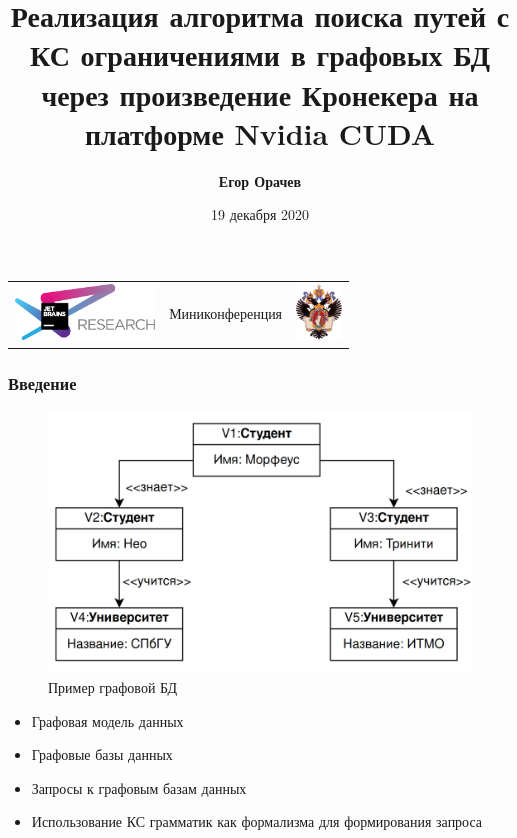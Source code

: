 \documentclass[xcolor=table,english]{beamer}
\title[Kronecker CFPQ GPGPU]{Реализация алгоритма поиска путей с КС ограничениями в графовых БД через произведение Кронекера на платформе Nvidia CUDA}
\institute[СПбГУ]{
JetBrains Research, Лаборатория языковых инструментов  \\
Санкт-Петербургский Государственный университет
}
\author[Егор Орачев]{\textbf{Егор Орачев}}
\date{19 декабря 2020}
\begin{document}
{
\begin{frame}[fragile]
  \begin{table}
  \centering
  \begin{tabularx}{\linewidth}{YcX}
    \includegraphics[height=1.5cm]{pictures/jetbrainsResearch.pdf} \hfill
    & \begin{minipage}[t]{0.3\textwidth}\center \vspace{-1cm} Миниконференция
      \end{minipage}
    & \hfill \includegraphics[height=1.5cm]{pictures/SPbGU_Logo.png}
  \end{tabularx}
  \end{table}
  \titlepage
\end{frame}
}

\begin{frame}[fragile] \frametitle{Введение}
    \begin{minipage}[m]{0.5\linewidth}
        \begin{figure}
            \centering
            \includegraphics[width=\textwidth]{figures/db_example.png}
            \caption{Пример графовой БД}
            \label{fig:architecture}
        \end{figure}
    \end{minipage}\hfill
    \begin{minipage}[m]{0.5\linewidth}
        \begin{itemize}
            \item Графовая модель данных
            \item Графовые базы данных
            \item Запросы к графовым базам данных
            \item Использование КС грамматик как формализма для формирования запроса
        \end{itemize}
    \end{minipage}
\end{frame}
\end{document}
